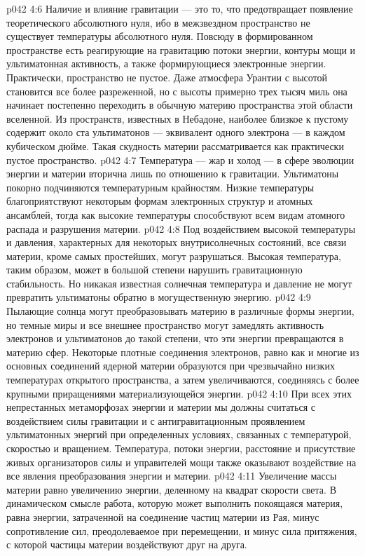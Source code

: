 \vs p042 4:6 Наличие и влияние гравитации --- это то, что предотвращает появление теоретического абсолютного нуля, ибо в межзвездном пространство не существует температуры абсолютного нуля. Повсюду в формированном пространстве есть реагирующие на гравитацию потоки энергии, контуры мощи и ультиматонная активность, а также формирующиеся электронные энергии. Практически, пространство не пустое. Даже атмосфера Урантии с высотой становится все более разреженной, но с высоты примерно трех тысяч миль она начинает постепенно переходить в обычную материю пространства этой области вселенной. Из пространств, известных в Небадоне, наиболее близкое к пустому содержит около ста ультиматонов --- эквивалент одного электрона --- в каждом кубическом дюйме. Такая скудность материи рассматривается как практически пустое пространство.
\vs p042 4:7 Температура --- жар и холод --- в сфере эволюции энергии и материи вторична лишь по отношению к гравитации. Ультиматоны покорно подчиняются температурным крайностям. Низкие температуры благоприятствуют некоторым формам электронных структур и атомных ансамблей, тогда как высокие температуры способствуют всем видам атомного распада и разрушения материи.
\vs p042 4:8 Под воздействием высокой температуры и давления, характерных для некоторых внутрисолнечных состояний, все связи материи, кроме самых простейших, могут разрушаться. Высокая температура, таким образом, может в большой степени нарушить гравитационную стабильность. Но никакая известная солнечная температура и давление не могут превратить ультиматоны обратно в могущественную энергию.
\vs p042 4:9 Пылающие солнца могут преобразовывать материю в различные формы энергии, но темные миры и все внешнее пространство могут замедлять активность электронов и ультиматонов до такой степени, что эти энергии превращаются в материю сфер. Некоторые плотные соединения электронов, равно как и многие из основных соединений ядерной материи образуются при чрезвычайно низких температурах открытого пространства, а затем увеличиваются, соединяясь с более крупными приращениями материализующейся энергии.
\vs p042 4:10 При всех этих непрестанных метаморфозах энергии и материи мы должны считаться с воздействием силы гравитации и с антигравитационным проявлением ультиматонных энергий при определенных условиях, связанных с температурой, скоростью и вращением. Температура, потоки энергии, расстояние и присутствие живых организаторов силы и управителей мощи также оказывают воздействие на все явления преобразования энергии и материи.
\vs p042 4:11 Увеличение массы материи равно увеличению энергии, деленному на квадрат скорости света. В динамическом смысле работа, которую может выполнить покоящаяся материя, равна энергии, затраченной на соединение частиц материи из Рая, минус сопротивление сил, преодолеваемое при перемещении, и минус сила притяжения, с которой частицы материи воздействуют друг на друга.
